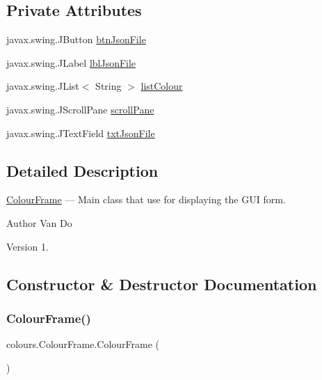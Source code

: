 \subsection*{Private Attributes}
\begin{DoxyCompactItemize}
\item 
javax.\+swing.\+J\+Button \hyperlink{classcolours_1_1_colour_frame_a1fe23149a50772dff538d0004e7cb1ee}{btn\+Json\+File}
\item 
javax.\+swing.\+J\+Label \hyperlink{classcolours_1_1_colour_frame_a3465e8e9a196ae2a3249b5212e954594}{lbl\+Json\+File}
\item 
javax.\+swing.\+J\+List$<$ String $>$ \hyperlink{classcolours_1_1_colour_frame_a9c6b0ac09f52427530bd1e0fbc285cc2}{list\+Colour}
\item 
javax.\+swing.\+J\+Scroll\+Pane \hyperlink{classcolours_1_1_colour_frame_a4101dbab121b9af67cb0ff9ef3c64a7a}{scroll\+Pane}
\item 
javax.\+swing.\+J\+Text\+Field \hyperlink{classcolours_1_1_colour_frame_adaffa1254ad772940748d49324e191a0}{txt\+Json\+File}
\end{DoxyCompactItemize}


\subsection{Detailed Description}
\hyperlink{classcolours_1_1_colour_frame}{Colour\+Frame} --- Main class that use for displaying the G\+UI form. \begin{DoxyAuthor}{Author}
Van Do 
\end{DoxyAuthor}
\begin{DoxyVersion}{Version}
1. 
\end{DoxyVersion}


\subsection{Constructor \& Destructor Documentation}
\mbox{\label{classcolours_1_1_colour_frame_ab7b3858b7fb97ff26bf7534c1767270c}} 
\subsubsection{\texorpdfstring{Colour\+Frame()}{ColourFrame()}}
{\footnotesize\ttfamily colours.\+Colour\+Frame.\+Colour\+Frame (\begin{DoxyParamCaption}{ }\end{DoxyParamCaption})\hspace{0.3cm}{\ttfamily [inline]}}

